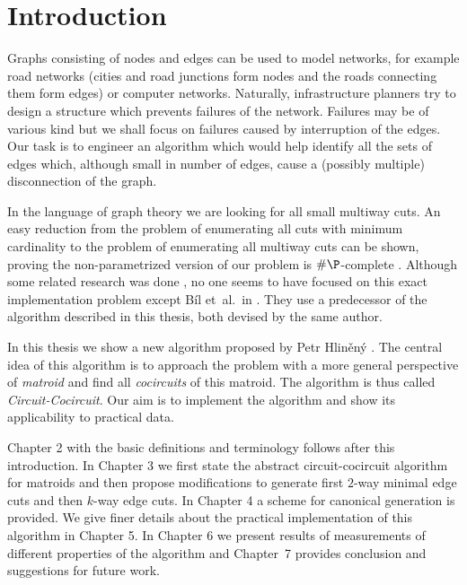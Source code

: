 
\chapter{Introduction}

Graphs consisting of nodes and edges can be used to model networks, for example road networks (cities and road junctions form nodes and the roads connecting them form edges) or computer networks. Naturally, infrastructure planners try to design a structure which prevents failures of the network. Failures may be of various kind but we shall focus on failures caused by interruption of the edges. Our task is to engineer an algorithm which would help identify all the sets of edges which, although small in number of edges, cause a (possibly multiple) disconnection of the graph.

In the language of graph theory we are looking for all small multiway cuts. An easy reduction from the problem of enumerating all cuts with minimum cardinality to the problem of enumerating all multiway cuts can be shown, proving the non-parametrized version of our problem is $\#\P$-complete \cite{Provan1983}. Although some related research was done \cite{cactus}, no one seems to have focused on this exact implementation problem except Bíl et~al.\ in \cite{cdv}. They use a predecessor of the algorithm described in this thesis, both devised by the same author.

In this thesis we show a new algorithm proposed by Petr Hliněný \cite{hlineny_circuitcocircuit}. The central idea of this algorithm is to approach the problem with a more general perspective of \textit{matroid} and find all \textit{cocircuits} of this matroid. The algorithm is thus called \textit{Circuit-Cocircuit}. Our aim is to implement the algorithm and show its applicability to practical data.

Chapter 2 with the basic definitions and terminology follows after this introduction. In Chapter 3 we first state the abstract circuit-cocircuit algorithm for matroids and then propose modifications to generate first $2$-way minimal edge cuts and then $k$-way edge cuts. In Chapter 4 a scheme for canonical generation is provided. We give finer details about the practical implementation of this algorithm in Chapter 5. In Chapter 6 we present results of measurements of different properties of the algorithm and Chapter~7 provides conclusion and suggestions for future work.

